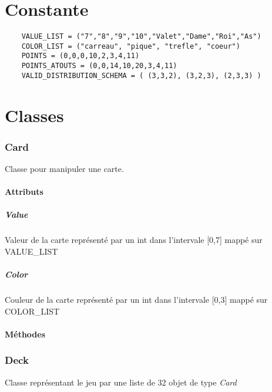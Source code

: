 \documentclass[11pt,oneside,a4paper]{article}
\begin{document}
\part{Constante}
\begin{verbatim}
	VALUE_LIST = ("7","8","9","10","Valet","Dame","Roi","As") 
	COLOR_LIST = ("carreau", "pique", "trefle", "coeur")
	POINTS = (0,0,0,10,2,3,4,11)
	POINTS_ATOUTS = (0,0,14,10,20,3,4,11)
	VALID_DISTRIBUTION_SCHEMA = ( (3,3,2), (3,2,3), (2,3,3) )
\end{verbatim}


\part{Classes}

\section{Card}
Classe pour manipuler une carte.

\subsection{Attributs}
	\subsubsection{Value} Valeur de la carte représenté par un int dans l'intervale [0,7] mappé sur VALUE\_LIST
	\subsubsection{Color}
	Couleur de la carte représenté par un int dans l'intervale [0,3] mappé sur COLOR\_LIST

\subsection{Méthodes}
	
\section{Deck}
Classe représentant le jeu par une liste de 32 objet de type \textit{Card}
\end{document}

